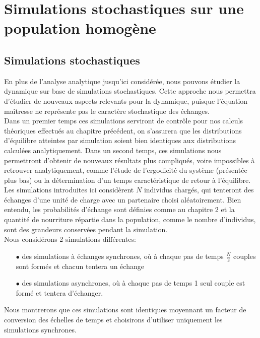\chapter{Simulations stochastiques sur une population homogène}
\section{Simulations stochastiques}
En plus de l'analyse analytique jusqu'ici considérée, nous pouvons étudier la dynamique sur base de simulations stochastiques. Cette approche nous permettra d'étudier de nouveaux aspects relevants pour la dynamique, puisque l'équation maîtresse ne représente pas le caractère stochastique des échanges.\\

Dans un premier temps ces simulations serviront de contrôle pour nos calculs théoriques effectués au chapitre précédent, on s'assurera que les distributions d'équilibre atteintes par simulation soient bien identiques aux distributions calculées analytiquement. Dans un second temps, ces simulations nous permettront d'obtenir de nouveaux résultats plus compliqués, voire impossibles à retrouver analytiquement, comme l'étude de l'ergodicité du système (présentée plus bas) ou la détermination d'un temps caractéristique de retour à l'équilibre.\\

Les simulations introduites ici considèrent $N$ individus chargés, qui tenteront des échanges d'une unité de charge avec un partenaire choisi aléatoirement. Bien entendu, les probabilités d'échange sont définies comme au chapitre 2 et la quantité de nourriture répartie dans la population, comme le nombre d'individus, sont des grandeurs conservées pendant la simulation.\\

Nous considérons 2 simulations différentes:
\begin{itemize}
\item[$\bullet$] des simulations à échanges synchrones, où à chaque pas de temps $\frac{N}{2}$ couples sont formés et chacun tentera un échange
\item[$\bullet$] des simulations asynchrones, où à chaque pas de temps 1 seul couple est formé et tentera d'échanger.\\
\end{itemize}

Nous montrerons que ces simulations sont identiques moyennant un facteur de conversion des échelles de temps et choisirons d'utiliser uniquement les simulations synchrones.\\


